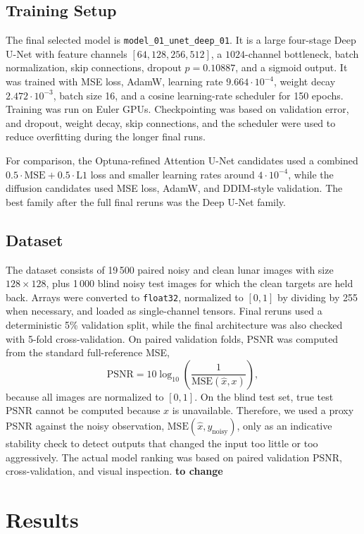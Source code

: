 \documentclass[a4paper,10pt]{article}
\begin{document}
\subsection{Training Setup}
The final selected model is \texttt{model\_01\_unet\_deep\_01}. It is a large four-stage 
Deep U-Net with feature channels $[64,128,256,512]$, a $1024$-channel bottleneck, 
batch normalization, skip connections, dropout $p=0.10887$, and a sigmoid output. 
It was trained with MSE loss, AdamW, learning rate $9.664\cdot10^{-4}$, weight decay 
$2.472\cdot10^{-3}$, batch size 16, and a cosine learning-rate scheduler for 150 epochs. 
Training was run on Euler GPUs. Checkpointing was based on validation error, and 
dropout, weight decay, skip connections, and the scheduler were used to reduce 
overfitting during the longer final runs.

For comparison, the Optuna-refined Attention U-Net candidates used a combined 
$0.5\cdot\mathrm{MSE}+0.5\cdot\mathrm{L1}$ loss and smaller learning rates around 
$4\cdot10^{-4}$, while the diffusion candidates used MSE loss, AdamW, and DDIM-style 
validation. The best family after the full final reruns was the Deep U-Net family.

\subsection{Dataset}
The dataset consists of 19\,500 paired noisy and clean lunar images with size 
$128\times128$, plus 1\,000 blind noisy test images for which the clean targets are 
held back. Arrays were converted to \texttt{float32}, normalized to $[0,1]$ by dividing 
by 255 when necessary, and loaded as single-channel tensors. Final reruns used a 
deterministic 5\% validation split, while the final architecture was also checked with 
5-fold cross-validation. On paired validation folds, PSNR was computed from the 
standard full-reference MSE,
\[
\mathrm{PSNR}=10\log_{10}\left(\frac{1}{\mathrm{MSE}(\hat{x},x)}\right),
\]
because all images are normalized to $[0,1]$. On the blind test set, true test PSNR 
cannot be computed because $x$ is unavailable. Therefore, we used a proxy PSNR against 
the noisy observation, $\mathrm{MSE}(\hat{x},y_{\mathrm{noisy}})$, only as an indicative 
stability check to detect outputs that changed the input too little or too aggressively. 
The actual model ranking was based on paired validation PSNR, cross-validation, and 
visual inspection. \textbf{to change}

\section{Results}
\end{document}
